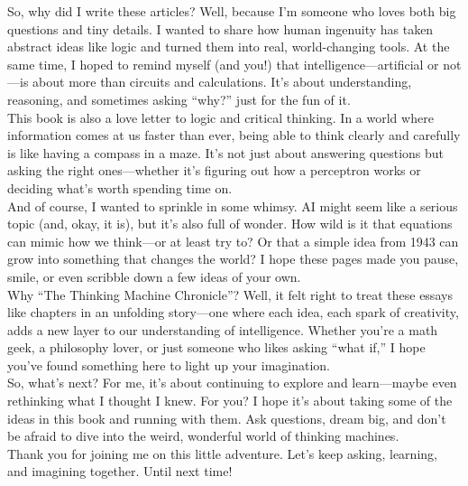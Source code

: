 \documentclass[11p,oneside]{book}
\begin{document}
So, why did I write these articles? Well, because I’m someone who loves both big questions and tiny details. I wanted to share how human ingenuity has taken abstract ideas like logic and turned them into real, world-changing tools. At the same time, I hoped to remind myself (and you!) that intelligence—artificial or not—is about more than circuits and calculations. It’s about understanding, reasoning, and sometimes asking “why?” just for the fun of it.
\\

This book is also a love letter to logic and critical thinking. In a world where information comes at us faster than ever, being able to think clearly and carefully is like having a compass in a maze. It’s not just about answering questions but asking the right ones—whether it’s figuring out how a perceptron works or deciding what’s worth spending time on.\\

And of course, I wanted to sprinkle in some whimsy. AI might seem like a serious topic (and, okay, it is), but it’s also full of wonder. How wild is it that equations can mimic how we think—or at least try to? Or that a simple idea from 1943 can grow into something that changes the world? I hope these pages made you pause, smile, or even scribble down a few ideas of your own.
\\

Why “The Thinking Machine Chronicle”? Well, it felt right to treat these essays like chapters in an unfolding story—one where each idea, each spark of creativity, adds a new layer to our understanding of intelligence. Whether you’re a math geek, a philosophy lover, or just someone who likes asking “what if,” I hope you’ve found something here to light up your imagination.
\\

So, what’s next? For me, it’s about continuing to explore and learn—maybe even rethinking what I thought I knew. For you? I hope it’s about taking some of the ideas in this book and running with them. Ask questions, dream big, and don’t be afraid to dive into the weird, wonderful world of thinking machines.
\\

Thank you for joining me on this little adventure. Let’s keep asking, learning, and imagining together. Until next time!
\end{document}
